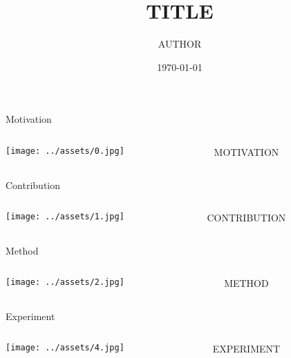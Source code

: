\documentclass[8pt]{beamer}
\title{TITLE}
\author{AUTHOR}
\date{\today}
\begin{document}
\begin{frame}
\titlepage
\end{frame}

\begin{frame}{Motivation}
\begin{columns}
    \begin{column}{.6\linewidth}
        \texttt{[image: ../assets/0.jpg]}
    \end{column}
    \begin{column}{.4\linewidth}
        \begin{itemize}
            MOTIVATION
        \end{itemize}
    \end{column}
\end{columns}
\end{frame}

\begin{frame}{Contribution}
\begin{columns}
    \begin{column}{.6\linewidth}
        \texttt{[image: ../assets/1.jpg]}
    \end{column}
    \begin{column}{.4\linewidth}
        \begin{itemize}
            CONTRIBUTION
        \end{itemize}
    \end{column}
\end{columns}
\end{frame}

\begin{frame}{Method}
\begin{columns}
    \begin{column}{.6\linewidth}
        \texttt{[image: ../assets/2.jpg]}
    \end{column}
    \begin{column}{.4\linewidth}
        \begin{itemize}
            METHOD
        \end{itemize}
    \end{column}
\end{columns}
\end{frame}

\begin{frame}{Experiment}
\begin{columns}
    \begin{column}{.6\linewidth}
        \texttt{[image: ../assets/4.jpg]}
    \end{column}
    \begin{column}{.4\linewidth}
        \begin{itemize}
            EXPERIMENT
        \end{itemize}
    \end{column}
\end{columns}
\end{frame}
\end{document}
